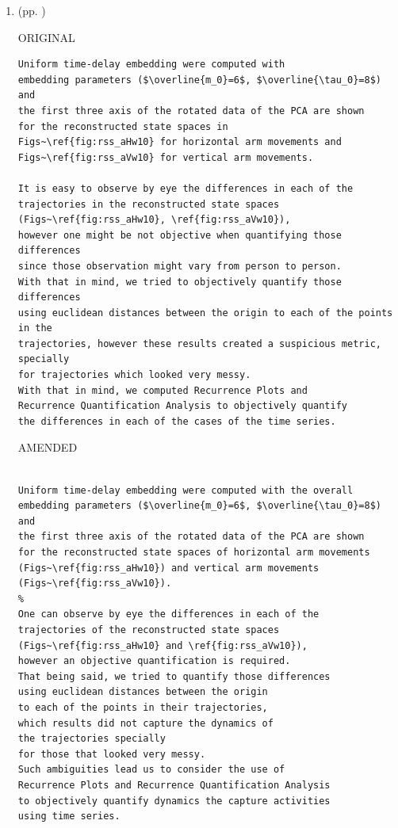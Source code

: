 \documentclass[10pt]{article}
\begin{document}
\begin{enumerate}
\begin{verbatim}
We also computed a sample mean for an overall minimum embedding parameters that 
represent all participants, activities, sensors and levels of smoothness.
The sample mean for the minimum values of $E_{1}(m)$ from Figs \ref{fig:cao_ami}(A) 
is $\overline{m}_0=6$ 
and the sample mean for minimum values of AMIs from Figs~\ref{fig:cao_ami}(B)
is $\overline{\tau}_0=8$.
%
\end{verbatim}

\textit{
	LOG: 
Thu 19 Mar 21:58:23 GMT 2020
	}
	\\




\item  (pp. ) 

ORIGINAL
\begin{verbatim}
Uniform time-delay embedding were computed with
embedding parameters ($\overline{m_0}=6$, $\overline{\tau_0}=8$) and 
the first three axis of the rotated data of the PCA are shown 
for the reconstructed state spaces in 
Figs~\ref{fig:rss_aHw10} for horizontal arm movements and 
Figs~\ref{fig:rss_aVw10} for vertical arm movements.

It is easy to observe by eye the differences in each of the
trajectories in the reconstructed state spaces 
(Figs~\ref{fig:rss_aHw10}, \ref{fig:rss_aVw10}), 
however one might be not objective when quantifying those differences 
since those observation might vary from person to person.
With that in mind, we tried to objectively quantify those differences 
using euclidean distances between the origin to each of the points in the 
trajectories, however these results created a suspicious metric, specially 
for trajectories which looked very messy.
With that in mind, we computed Recurrence Plots and 
Recurrence Quantification Analysis to objectively quantify 
the differences in each of the cases of the time series.

\end{verbatim}
AMENDED
\begin{verbatim}

Uniform time-delay embedding were computed with the overall 
embedding parameters ($\overline{m_0}=6$, $\overline{\tau_0}=8$) and 
the first three axis of the rotated data of the PCA are shown 
for the reconstructed state spaces of horizontal arm movements
(Figs~\ref{fig:rss_aHw10}) and vertical arm movements 
(Figs~\ref{fig:rss_aVw10}).
%
One can observe by eye the differences in each of the
trajectories of the reconstructed state spaces 
(Figs~\ref{fig:rss_aHw10} and \ref{fig:rss_aVw10}), 
however an objective quantification is required.
That being said, we tried to quantify those differences 
using euclidean distances between the origin 
to each of the points in their trajectories, 
which results did not capture the dynamics of 
the trajectories specially 
for those that looked very messy.
Such ambiguities lead us to consider the use of 
Recurrence Plots and Recurrence Quantification Analysis 
to objectively quantify dynamics the capture activities 
using time series.



\end{verbatim}
\end{enumerate}
\end{document}
